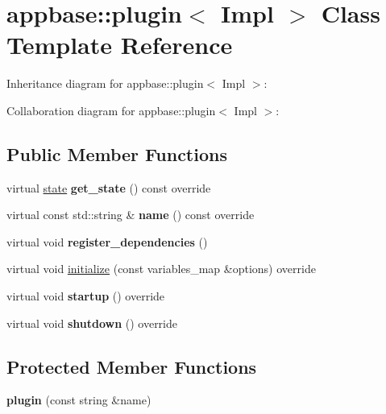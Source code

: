 \hypertarget{classappbase_1_1plugin}{}\section{appbase\+:\+:plugin$<$ Impl $>$ Class Template Reference}
\label{classappbase_1_1plugin}


Inheritance diagram for appbase\+:\+:plugin$<$ Impl $>$\+:


Collaboration diagram for appbase\+:\+:plugin$<$ Impl $>$\+:
\subsection*{Public Member Functions}
\begin{DoxyCompactItemize}
\item 
\mbox{\label{classappbase_1_1plugin_a857288c2424b57a898c0579d25dacbb0}} 
virtual \mbox{\hyperlink{classappbase_1_1abstract__plugin_a4a997c146c27d5baf538a6c987c86408}{state}} {\bfseries get\+\_\+state} () const override
\item 
\mbox{\label{classappbase_1_1plugin_a5f4d78270db430516429d70b1ff3abbe}} 
virtual const std\+::string \& {\bfseries name} () const override
\item 
\mbox{\label{classappbase_1_1plugin_a6a0cd7ccc873527ebb5e6716b249ea17}} 
virtual void {\bfseries register\+\_\+dependencies} ()
\item 
virtual void \mbox{\hyperlink{classappbase_1_1plugin_ac28755a82831d41e5d0ef0ce56b10fa9}{initialize}} (const variables\+\_\+map \&options) override
\item 
\mbox{\label{classappbase_1_1plugin_a10e4e1c582bfadf67f510df76d87abfd}} 
virtual void {\bfseries startup} () override
\item 
\mbox{\label{classappbase_1_1plugin_a21e5be5587fca41fbc91367d449b8f27}} 
virtual void {\bfseries shutdown} () override
\end{DoxyCompactItemize}
\subsection*{Protected Member Functions}
\begin{DoxyCompactItemize}
\item 
\mbox{\label{classappbase_1_1plugin_a51f43c3c64ab8524928698a72a186822}} 
{\bfseries plugin} (const string \&name)
\end{DoxyCompactItemize}
